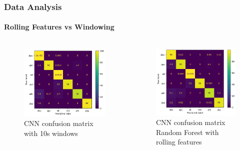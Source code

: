 \documentclass[
	11pt, %
]{beamer}
\begin{document}
\begin{frame}

    \frametitle{Data Analysis}
    \framesubtitle{Rolling Features vs Windowing}

    \begin{columns}        
        \begin{figure}
            \includegraphics[width=0.9\linewidth]{cm_sliding_500.png}
            \caption{CNN confusion matrix with 10s windows}
        \end{figure}

        \begin{figure}
            \includegraphics[width=0.9\linewidth]{cm_rtc_after.png}
            \caption{CNN confusion matrix Random Forest with rolling features}
        \end{figure}
    \end{columns}
    
\end{frame}
\end{document}
